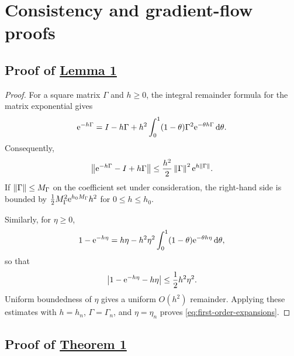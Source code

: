 \section{Consistency and gradient-flow proofs}
\label{app:consistency}

\subsection{Proof of \hyperref[lem:expansions]{Lemma 1}}
\label{app:expansions}

\begin{proof}
For a square matrix $\Gamma$ and $h\ge0$, the integral remainder formula for
the matrix exponential gives
\begin{equation}
 \mathrm{e}^{-h\Gamma}
 =I-h\Gamma+
 h^2\int_0^1(1-\theta)\Gamma^2\mathrm{e}^{-\theta h\Gamma}\,\mathrm{d}\theta.
 \label{eq:matrix-exp-remainder}
\end{equation}
Consequently,
\begin{equation}
 \left\lVert \mathrm{e}^{-h\Gamma}-I+h\Gamma\right\rVert
 \le \frac{h^2}{2}\left\lVert \Gamma\right\rVert^2\mathrm{e}^{h\left\lVert \Gamma\right\rVert}.
 \label{eq:matrix-exp-bound}
\end{equation}
If $\left\lVert \Gamma\right\rVert\le M_\Gamma$ on the coefficient set under consideration,
the right-hand side is bounded by
$\tfrac12M_\Gamma^2\mathrm{e}^{h_0M_\Gamma}h^2$ for $0\le h\le h_0$.

Similarly, for $\eta\ge0$,
\begin{equation}
 1-\mathrm{e}^{-h\eta}
 =h\eta-h^2\eta^2\int_0^1(1-\theta)\mathrm{e}^{-\theta h\eta}\,\mathrm{d}\theta,
 \label{eq:beta-remainder}
\end{equation}
so that
\begin{equation}
 \left|1-\mathrm{e}^{-h\eta}-h\eta\right|
 \le\frac12h^2\eta^2.
 \label{eq:beta-remainder-bound}
\end{equation}
Uniform boundedness of $\eta$ gives a uniform $O(h^2)$ remainder. Applying
these estimates with $h=h_n$, $\Gamma=\Gamma_n$, and $\eta=\eta_n$ proves
\eqref{eq:first-order-expansions}.
\end{proof}

\subsection{Proof of \hyperref[thm:local-consistency]{Theorem 1}}
\label{app:local-consistency}

